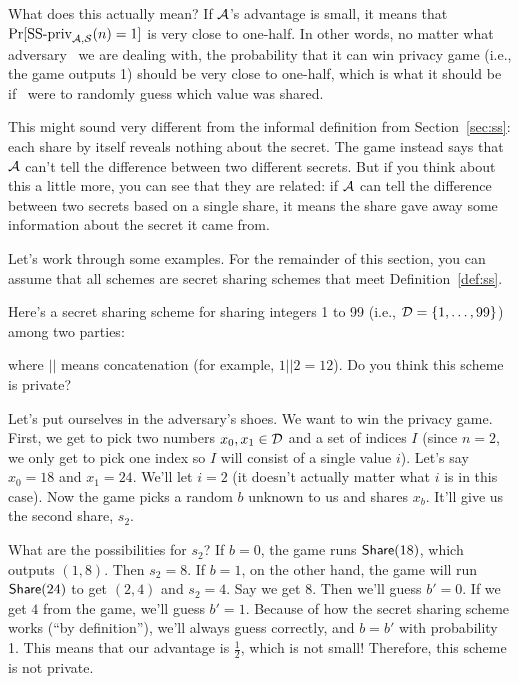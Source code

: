 What does this actually mean? If $\mathcal{A}$'s advantage is small, it means that 
$\Pr[\textnormal{SS-priv}_{\mathcal{A},\mathcal{S}}(n)=1]$ is very close to one-half. In 
other words, no matter what adversary \A~we are dealing with, the probability 
that it can win privacy game (i.e., the game outputs 1) should be very close
to one-half, which is what it should be if \A~were to randomly guess which 
value was shared.

This might sound very different from the informal definition from Section~\ref{sec:ss}:
each share by itself reveals nothing about the secret. The game instead says 
that $\mathcal{A}$ can't tell the difference between two different secrets. But if 
you think about this a little more, you can see that they are related: if 
$\mathcal{A}$ can tell the difference between two secrets based on a single share, 
it means the share gave away some information about the secret it came from.

\bigskip
Let's work through some examples. For the remainder of this section, you can 
assume that all schemes are secret sharing schemes that meet Definition~\ref{def:ss}.

\begin{example}
    Here's a secret sharing scheme for sharing integers 1 to 99 (i.e., 
    $\mathcal{D} = \{1, \ldots, 99\}$) among two parties:
    \begin{pchstack}[center]
    \pchspace
    \end{pchstack}
    where $||$ means concatenation (for example, $1 || 2 = 12$). Do you 
    think this scheme is private?

    Let's put ourselves in the adversary's shoes. We want to win the 
    privacy game. First, we get to pick two numbers $x_0, x_1 \in \mathcal{D}$ and 
    a set of indices $I$ (since $n=2$, we only get to pick one index so $I$ will consist of a single value $i$). Let's say $x_0 = 18$ and $x_1 = 24$. We'll let $i=2$ 
    (it doesn't actually matter what $i$ is in this case). Now the game 
    picks a random $b$ unknown to us and shares $x_b$. It'll give us the 
    second share, $s_2$. 
    
    What are the possibilities for $s_2$? If $b=0$, the game runs $\mathsf{Share}(18)$,
    which outputs $(1,8)$. Then $s_2 = 8$. If $b=1$, on the other hand, 
    the game will run $\mathsf{Share}(24)$ to get $(2,4)$ and $s_2 = 4$. Say 
    we get $8$. Then we'll guess $b' = 0$. If we get $4$ from the game, we'll 
    guess $b'=1$. Because of how the secret sharing scheme works (``by 
    definition''), we'll always guess correctly, and $b=b'$ with probability 
    1. This means that our advantage is $\frac{1}{2}$, which is not small!
    Therefore, this scheme is not private.
\end{example}

